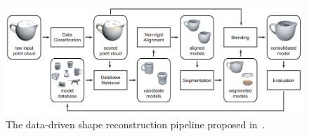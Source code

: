 \begin{figure}[t]
\centering
    \includegraphics[width=1.0\columnwidth]{fig/img/pauly_sgp05_esr.png}
    \caption{The data-driven shape reconstruction pipeline proposed in~\protect\cite{Pauly:2005:ESC}.}
    \label{fig:pauly_sgp05_esr}
\end{figure}

